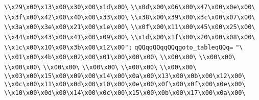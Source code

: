 \verb|\\x29\x00\x13\x00\x30\x00\x1d\x00\|\newline
\verb|\\x0d\x00\x06\x00\x47\x00\x0e\x00\|\newline
\verb|\\x3f\x00\x42\x00\x40\x00\x33\x00\|\newline
\verb|\\x38\x00\x39\x00\x3c\x00\x07\x00\|\newline
\verb|\\x3a\x00\x3e\x00\x21\x00\x1e\x00\|\newline
\verb|\\x0f\x00\x11\x00\x45\x00\x25\x00\|\newline
\verb|\\x44\x00\x43\x00\x41\x00\x09\x00\|\newline
\verb|\\x1d\x00\x1f\x00\x20\x00\x08\x00\|\newline
\verb|\\x1c\x00\x10\x00\x3b\x00\x12\x00";|\newline
\verb|qQQqqQQqqQQqgoto_tableqQQq=|\newline
\verb|"\|\newline
\verb|\\x01\x00\x4b\x00\x02\x00\x01\x00\x00\x00\|\newline
\verb|\\x00\x00\|\newline
\verb|\\x00\x00\|\newline
\verb|\\x00\x00\|\newline
\verb|\\x00\x00\|\newline
\verb|\\x00\x00\|\newline
\verb|\\x00\x00\|\newline
\verb|\\x00\x00\|\newline
\verb|\\x03\x00\x15\x00\x09\x00\x14\x00\x0a\x00\x13\x00\x0b\x00\x12\x00\|\newline
\verb|\\x0c\x00\x11\x00\x0d\x00\x10\x00\x0e\x00\x0f\x00\x0f\x00\x0e\x00\|\newline
\verb|\\x10\x00\x0d\x00\x14\x00\x0c\x00\x15\x00\x0b\x00\x17\x00\x0a\x00\|\newline
